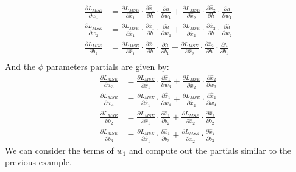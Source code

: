 \documentclass[answers,12pt,addpoints]{exam}
\begin{document}
\begin{align*}
    \frac{\partial L_{MSE}}{\partial w_1} &= \frac{\partial L_{MSE}}{\partial \hat{x}_1} \cdot \frac{\partial \hat{x}_1}{\partial h} \cdot \frac{\partial h}{\partial w_1} + \frac{\partial L_{MSE}}{\partial \hat{x}_2} \cdot \frac{\partial \hat{x}_2}{\partial h} \cdot \frac{\partial h}{\partial w_1} \\
    \frac{\partial L_{MSE}}{\partial w_2} &= \frac{\partial L_{MSE}}{\partial \hat{x}_1} \cdot \frac{\partial \hat{x}_1}{\partial h} \cdot \frac{\partial h}{\partial w_2} + \frac{\partial L_{MSE}}{\partial \hat{x}_2} \cdot \frac{\partial \hat{x}_2}{\partial h} \cdot \frac{\partial h}{\partial w_2} \\
    \frac{\partial L_{MSE}}{\partial b_1} &= \frac{\partial L_{MSE}}{\partial \hat{x}_1} \cdot \frac{\partial \hat{x}_1}{\partial h} \cdot \frac{\partial h}{\partial b_1} + \frac{\partial L_{MSE}}{\partial \hat{x}_2} \cdot \frac{\partial \hat{x}_2}{\partial h} \cdot \frac{\partial h}{\partial b_1} \\
\end{align*}
And the $\phi$ parameters partials are given by:
\begin{align*}
    \frac{\partial L_{MSE}}{\partial w_3} &= \frac{\partial L_{MSE}}{\partial \hat{x}_1} \cdot \frac{\partial \hat{x}_1}{\partial w_3} + \frac{\partial L_{MSE}}{\partial \hat{x}_2} \cdot \frac{\partial \hat{x}_2}{\partial w_3} \\
    \frac{\partial L_{MSE}}{\partial w_4} &= \frac{\partial L_{MSE}}{\partial \hat{x}_1} \cdot \frac{\partial \hat{x}_1}{\partial w_4} + \frac{\partial L_{MSE}}{\partial \hat{x}_2} \cdot \frac{\partial \hat{x}_2}{\partial w_4} \\
    \frac{\partial L_{MSE}}{\partial b_2} &= \frac{\partial L_{MSE}}{\partial \hat{x}_1} \cdot \frac{\partial \hat{x}_1}{\partial b_2} + \frac{\partial L_{MSE}}{\partial \hat{x}_2} \cdot \frac{\partial \hat{x}_2}{\partial b_2} \\
    \frac{\partial L_{MSE}}{\partial b_3} &= \frac{\partial L_{MSE}}{\partial \hat{x}_1} \cdot \frac{\partial \hat{x}_1}{\partial b_3} + \frac{\partial L_{MSE}}{\partial \hat{x}_2} \cdot \frac{\partial \hat{x}_2}{\partial b_3}
\end{align*}
We can consider the terms of $w_1$ and compute out the partials similar to the previous example.
\end{document}
